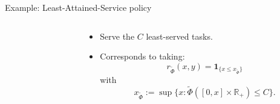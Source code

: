\documentclass[aspectratio=169]{beamer}
\newcommand{\R}{\mathbb{R}}
\begin{document}
\begin{frame}{Example: Least-Attained-Service policy}
\begin{columns}
\begin{column}{0.45\textwidth}
	\end{column}
	\begin{column}{0.55\textwidth}
		\begin{itemize}
			\item Serve the $C$ least-served tasks.
			\item Corresponds to taking:
				\begin{equation*}
					r_{\tilde\Phi}(x,y) = \mathbf{1}_{\{x\leqslant x_{\tilde\Phi}\}} 
				\end{equation*}
				with
				\begin{equation*} 
					x_{\tilde\Phi} := \sup\{x: \tilde\Phi([0, x] \times \R_+) \leqslant C\}. 	
				\end{equation*} 
		\end{itemize}
	\end{column}
\end{columns}

\end{frame}
\end{document}
